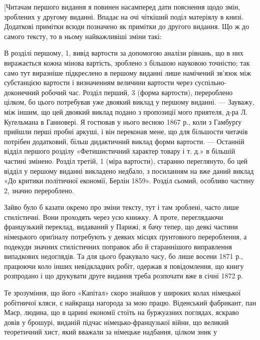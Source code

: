 
\label{original-81}
[Читачам першого видання я повинен насамперед дати пояснення
щодо змін, зроблених у другому виданні. Впадає на очі
чіткіший поділ матеріялу в книзі. Додаткові примітки всюди
позначено як примітки до другого видання. Що ж до самого тексту,
то в ньому найважливіші зміни такі:

В розділі першому, 1, вивід вартости за допомогою аналізи
рівнань, що в них виражається кожна мінова вартість, зроблено
з більшою науковою точністю; так само тут виразніше підкреслено
в першому виданні лише намічений зв’язок між субстанцією
вартости і визначенням величини вартости через суспільно-доконечний
робочий час. Розділ перший, 3 (форма вартости), перероблено
цілком, бо цього потребував уже двоякий виклад у
першому виданні. — Зауважу, між іншим, що цей двоякий виклад
подано з пропозиції мого приятеля, д-ра Л. Куґельмана в Ганновері.
Я гостював у нього весною 1867 р., коли з Гамбурґу
прийшли перші пробні аркуші, і він переконав мене, що для більшости
читачів потрібен додатковий, більш дидактичний виклад
форми вартости. — Останній відділ першого розділу «Фетишистичний
характер товару і т. д.» в більшій частині змінено. Розділ
третій, 1 (міра вартости), старанно переглянуто, бо цей відділ
у першому виданні викладено недбало, з посиланням на вже даний
виклад «До критики політичної економії, Берлін 1859». Розділ
сьомий, особливо частину 2, значно перероблено.

Зайво було б казати окремо про зміни тексту, тут і там зроблені,
часто лише стилістичні. Вони проходять через усю книжку.
А проте, переглядаючи французький переклад, видаваний у Парижі,
я бачу тепер, що деякі частини німецького ориґіналу потребують
у деяких місцях ґрунтовного перероблення, а подекуди
значних стилістичних поправок або й стараннішого виправлення
випадкових недоглядів. Та для цього бракувало часу, бо лише
восени 1871 р., працюючи коло інших невідкладних робіт, одержав
я повідомлення, що книгу розпродано і що друкувати друге
видання треба розпочати вже в січні 1872 р.

Те зрозуміння, що його «Капітал» скоро знайшов у широких
колах німецької робітничої кляси, є найкраща нагорода за мою
працю. Віденський фабрикант, пан Маєр, людина, що в царині
економії стоїть на буржуазних поглядах, яскраво довів у брошурі,
виданій підчас німецько-французької війни, що великий теоретичний
хист, який вважали за німецьке надбання, цілком зник у
\parbreak{}  %
